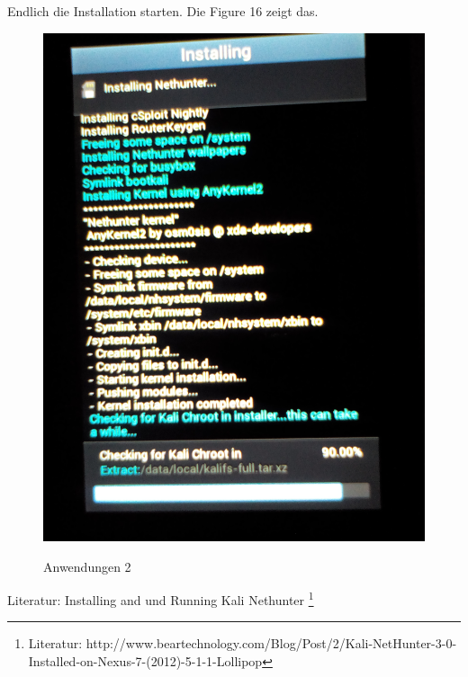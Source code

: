 \documentclass[11pt,a4paper]{article}
\begin{document}
Endlich die Installation starten. Die Figure 16 zeigt das. \\
\begin{figure}[H]
\begin{center} \includegraphics[scale=0.1]{./Image/img16}  \\
\caption{Anwendungen 2}
\end{center}
\end{figure} 

Literatur: Installing and und Running Kali Nethunter \footnote{
Literatur: http://www.beartechnology.com/Blog/Post/2/Kali-NetHunter-3-0-Installed-on-Nexus-7-(2012)-5-1-1-Lollipop}
\end{document}
